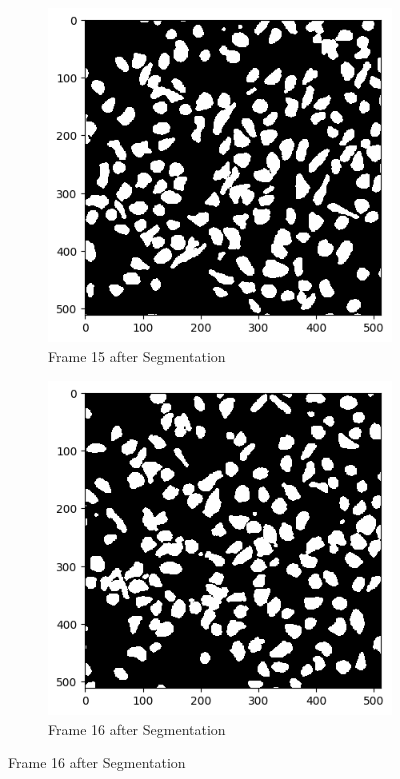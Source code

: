 \documentclass{article}
\begin{document}
\begin{figure}[h!]
  \begin{subfigure}{0.4\textwidth}
    \includegraphics[width=\linewidth]{Report/Appendix_Images/Segmentation-B-Growth/frame_15.png}
    \caption*{Frame 15 after Segmentation}
  \end{subfigure}
  \hfill
  \begin{subfigure}{0.4\textwidth}
    \includegraphics[width=\linewidth]{Report/Appendix_Images/Segmentation-B-Growth/frame_16.png}
    \caption*{Frame 16 after Segmentation}
  \end{subfigure}


\end{figure}
\end{document}
